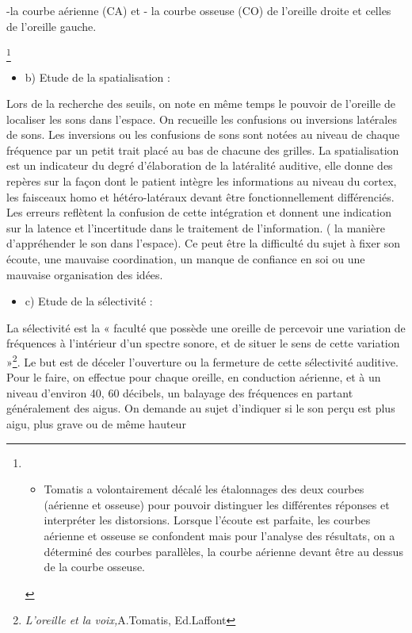 -la courbe aérienne (CA) et - la courbe osseuse (CO) de l'oreille
droite et celles de l'oreille gauche.

\footnote{\begin{itemize}
\item Tomatis a volontairement décalé les étalonnages des deux courbes (aérienne
et osseuse) pour pouvoir distinguer les différentes réponses et interpréter
les distorsions. Lorsque l\textquoteright écoute est parfaite, les
courbes aérienne et osseuse se confondent mais pour l'analyse des
résultats, on a déterminé des courbes parallèles, la courbe aérienne
devant être au dessus de la courbe osseuse.
\end{itemize}
}
\begin{itemize}
\item b) Etude de la spatialisation :
\end{itemize}
Lors de la recherche des seuils, on note en même temps le pouvoir
de l'oreille de localiser les sons dans l'espace. On recueille les
confusions ou inversions latérales de sons. Les inversions ou les
confusions de sons sont notées au niveau de chaque fréquence par un
petit trait placé au bas de chacune des grilles. La spatialisation
est un indicateur du degré d'élaboration de la latéralité auditive,
elle donne des repères sur la façon dont le patient intègre les informations
au niveau du cortex, les faisceaux homo et hétéro-latéraux devant
être fonctionnellement différenciés. Les erreurs reflètent la confusion
de cette intégration et donnent une indication sur la latence et l'incertitude
dans le traitement de l'information. ( la manière d'appréhender le
son dans l'espace). Ce peut être la difficulté du sujet à fixer son
écoute, une mauvaise coordination, un manque de confiance en soi ou
une mauvaise organisation des idées.
\begin{itemize}
\item c) Etude de la sélectivité : 
\end{itemize}
La sélectivité est la « faculté que possède une oreille de percevoir
une variation de fréquences à l'intérieur d'un spectre sonore, et
de situer le sens de cette variation »\footnote{\emph{L'oreille et la voix,}A.Tomatis, Ed.Laffont}.
Le but est de déceler l'ouverture ou la fermeture de cette sélectivité
auditive. Pour le faire, on effectue pour chaque oreille, en conduction
aérienne, et à un niveau d'environ 40, 60 décibels, un balayage des
fréquences en partant généralement des aigus. On demande au sujet
d'indiquer si le son perçu est plus aigu, plus grave ou de même hauteur
